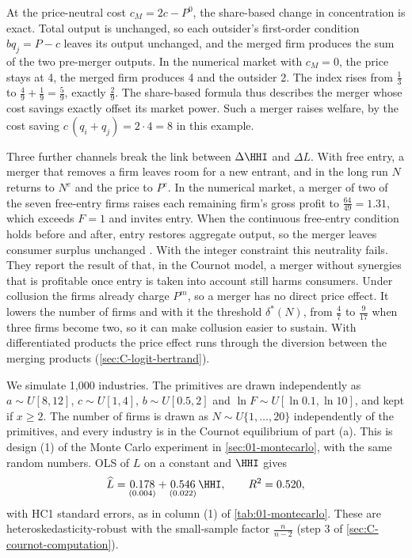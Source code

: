 \begin{remark}
At the price-neutral cost $c_M = 2c - P^0$, the share-based change in concentration is exact. Total output
is unchanged, so each outsider's first-order condition $bq_j = P - c$ leaves its output unchanged, and the
merged firm produces the sum of the two pre-merger outputs. In the numerical market with $c_M = 0$, the price
stays at 4, the merged firm produces 4 and the outsider 2. The index rises from $\frac{1}{3}$ to
$\frac{4}{9} + \frac{1}{9} = \frac{5}{9}$, exactly $\frac{2}{9}$. The share-based formula thus describes the
merger whose cost savings exactly offset its market power. Such a merger raises welfare, by the cost saving
$c\,(q_i + q_j) = 2 \cdot 4 = 8$ in this example.
\end{remark}

Three further channels break the link between $\Delta\HHI$ and $\Delta L$. With free entry, a merger that
removes a firm leaves room for a new entrant, and in the long run $N$ returns to $N^e$ and the price to $P^e$.
In the numerical market, a merger of two of the seven free-entry firms raises each remaining firm's gross
profit to $\frac{64}{49} = 1.31$, which exceeds $F = 1$ and invites entry. When the continuous free-entry condition
holds before and after, entry restores aggregate output, so the merger leaves consumer surplus unchanged
\citep[Section~3.3.3, pp.~231--232]{AskerNocke2021}. With the integer constraint this neutrality fails. They report
the result of \citet{Spector2003} that, in the Cournot model, a merger without synergies that is profitable once entry
is taken into account still harms consumers. Under collusion the firms already
charge $P^m$, so a merger has no direct price effect. It lowers the number of firms and with it the threshold
$\delta^*(N)$, from $\frac{4}{7}$ to $\frac{9}{17}$ when three firms become two, so it can make
collusion easier to sustain. With differentiated products the price effect runs through the diversion between
the merging products (\cref{sec:C-logit-bertrand}).

We simulate 1,000 industries. The primitives are drawn independently as $a \sim U[8, 12]$, $c \sim U[1, 4]$,
$b \sim U[0.5, 2]$ and $\ln F \sim U[\ln 0.1, \ln 10]$, and kept if $x \ge 2$. The number of firms is drawn as
$N \sim U\{1, \dots, 20\}$ independently of the primitives, and every industry is in the Cournot equilibrium of
part (a). This is design (1) of the Monte Carlo experiment in \cref{sec:01-montecarlo}, with the same random
numbers. OLS of $L$ on a constant and $\HHI$ gives
\begin{equation}\label{eq:C-mc-ols}
\widehat{L} = \underset{(0.004)}{0.178} + \underset{(0.022)}{0.546}\,\HHI, \qquad R^2 = 0.520,
\end{equation}
with HC1 standard errors, as in column (1) of \cref{tab:01-montecarlo}. These are heteroskedasticity-robust with the
small-sample factor $\frac{n}{n - 2}$ (step 3 of \cref{sec:C-cournot-computation}).


